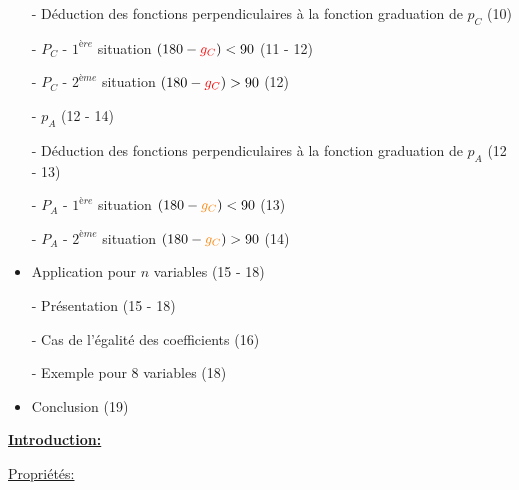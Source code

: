 \documentclass[10pt]{article}
\begin{document}
\begin{itemize}
        \hspace{2cm} - Déduction des fonctions perpendiculaires à la fonction graduation de $p_{C}$ \kitty (10)

        \hspace{2cm} - $P_{C}$ - $1^{ère}$ situation $(180 - \color{red}g_{C}\color{black}) < 90$ \kitty (11 - 12) 

        \hspace{2cm} - $P_{C}$ - $2^{ème}$ situation $(180 - \color{red}g_{C}\color{black}) > 90$ \kitty (12) 

        \hspace{1cm} - $p_{A}$ \kitty (12 - 14)

        \hspace{2cm} - Déduction des fonctions perpendiculaires à la fonction graduation de $p_{A}$ \kitty (12 - 13)

        \hspace{2cm} - $P_{A}$ - $1^{ère}$ situation $(180 - \color{orange}g_{C}\color{black}) < 90$ \kitty (13) 

        \hspace{2cm} - $P_{A}$ - $2^{ème}$ situation $(180 - \color{orange}g_{C}\color{black}) > 90$ \kitty (14) 

        \item Application pour $n$ variables \kitty (15 - 18) 

        \hspace{1cm} - Présentation \kitty (15 - 18)

        \hspace{2cm} - Cas de l'égalité des coefficients \kitty (16)

        \hspace{1cm} - Exemple pour 8 variables \kitty (18)

        \item Conclusion \kitty (19) 

\end{itemize}

\normalsize

\newpage

\vspace{1cm}

\normalsize

\uline{\textbf{Introduction:}}

\vspace{.5cm}

\uline{Propriétés:}
\end{document}
